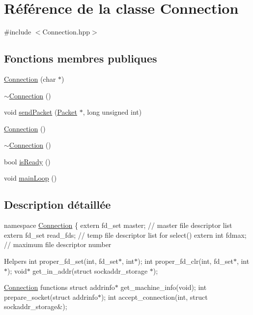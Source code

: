 \hypertarget{classConnection}{}\section{Référence de la classe Connection}
\label{classConnection}


{\ttfamily \#include $<$Connection.\+hpp$>$}

\subsection*{Fonctions membres publiques}
\begin{DoxyCompactItemize}
\item 
\hyperlink{classConnection_ab7b5c72eb0e2f7ce6f0e1f2c20b7389d}{Connection} (char $\ast$)
\item 
\hyperlink{classConnection_a2e4352edf667bea83001569e9da8a24d}{$\sim$\+Connection} ()
\item 
void \hyperlink{classConnection_acf311ea2f3df77851711daf40a07fc17}{send\+Packet} (\hyperlink{classPacket}{Packet} $\ast$, long unsigned int)
\item 
\hyperlink{classConnection_a9de94289ca6259f94ef6aeba3b134a77}{Connection} ()
\item 
\hyperlink{classConnection_a2e4352edf667bea83001569e9da8a24d}{$\sim$\+Connection} ()
\item 
bool \hyperlink{classConnection_a216b69187dbc0067c08b4d455e35d029}{is\+Ready} ()
\item 
void \hyperlink{classConnection_af5678fe6f97c6c7f1258cd0972652374}{main\+Loop} ()
\end{DoxyCompactItemize}


\subsection{Description détaillée}
namespace \hyperlink{classConnection}{Connection} \{ extern fd\+\_\+set master; // master file descriptor list extern fd\+\_\+set read\+\_\+fds; // temp file descriptor list for select() extern int fdmax; // maximum file descriptor number

Helpers int proper\+\_\+fd\+\_\+set(int, fd\+\_\+set$\ast$, int$\ast$); int proper\+\_\+fd\+\_\+clr(int, fd\+\_\+set$\ast$, int$\ast$); void$\ast$ get\+\_\+in\+\_\+addr(struct sockaddr\+\_\+storage $\ast$);

\hyperlink{classConnection}{Connection} functions struct addrinfo$\ast$ get\+\_\+machine\+\_\+info(void); int prepare\+\_\+socket(struct addrinfo$\ast$); int accept\+\_\+connection(int, struct sockaddr\+\_\+storage\&);

